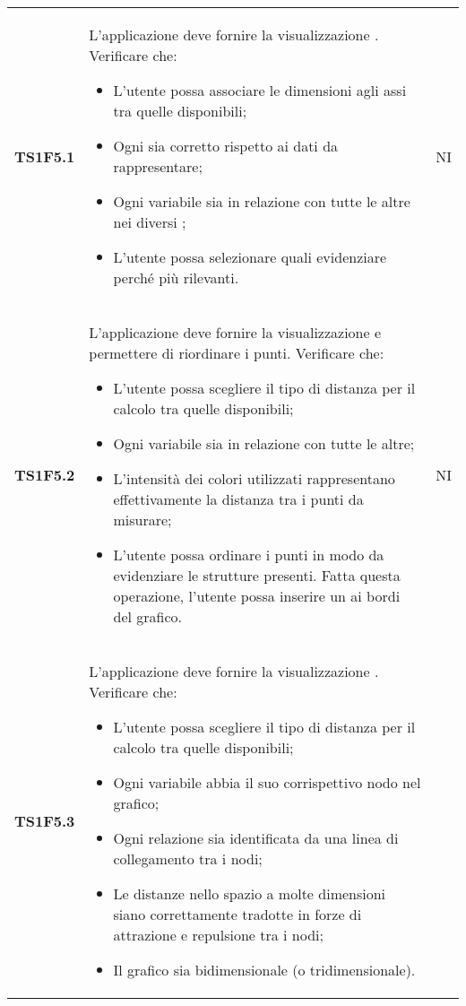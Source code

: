 \begin{longtable}{C{2cm} C{12cm} C{1.5cm}}
			   
\textbf{TS1F5.1} & L'applicazione deve fornire la visualizzazione . Verificare che:
					\begin{itemize}
					\item L'utente possa associare le dimensioni agli assi tra quelle disponibili;						
						\item Ogni  sia corretto rispetto ai dati da rappresentare;
						\item Ogni variabile sia in relazione con tutte le altre nei diversi ;
						\item L'utente possa selezionare quali  evidenziare perché più rilevanti.
					\end{itemize}	
				  & NI \\
\textbf{TS1F5.2} & L'applicazione deve fornire la visualizzazione  e permettere di riordinare i punti. Verificare che:
					\begin{itemize}
						\item L'utente possa scegliere il tipo di distanza per il calcolo tra quelle disponibili;						
						\item Ogni variabile sia in relazione con tutte le altre; 
						\item L'intensità dei colori utilizzati rappresentano effettivamente la distanza tra i punti da misurare;
						\item L'utente possa ordinare i punti in modo da evidenziare le strutture presenti. Fatta questa operazione, l'utente possa inserire un  ai bordi del grafico.
					\end{itemize}	
				 & NI \\
\textbf{TS1F5.3} & L'applicazione deve fornire la visualizzazione . Verificare che:
					\begin{itemize}
					\item L'utente possa scegliere il tipo di distanza per il calcolo tra quelle disponibili;	
						\item Ogni variabile abbia il suo corrispettivo nodo nel grafico;
						\item Ogni relazione sia identificata da una linea di collegamento tra i nodi;
						\item Le distanze nello spazio a molte dimensioni siano correttamente tradotte in forze di attrazione e repulsione tra i nodi;
						\item Il grafico sia bidimensionale (o tridimensionale).
					\end{itemize}	

\end{longtable}
